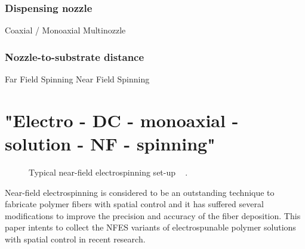 \documentclass[5p,,preprint,12pt,twocolumn]{elsarticle}
\makeatletter
\def\fixFloatSize#1{}%
\makeatother
\begin{document}
\subsubsection{Dispensing nozzle}Coaxial / Monoaxial \mbox{}\protect\newline Multinozzle



\subsubsection{Nozzle-to-substrate distance}Far Field Spinning \mbox{}\protect\newline Near Field Spinning
    
\section{"Electro - DC - monoaxial - solution - NF - spinning"}

\bgroup
\fixFloatSize{images/596d6818-a246-493e-bea0-03f815ab8ff8-unfes.jpg}
\begin{figure}[!htbp]
\centering \makeatletter{}
\makeatother 
\caption{{Typical near-field electrospinning set-up \unskip~\protect\cite{527120:11973130} .}}
\label{f-fe28447572e9}
\end{figure}
\egroup
Near-field electrospinning is considered to be an outstanding technique to fabricate polymer fibers with spatial control and it has suffered several modifications to improve the precision and accuracy of the fiber deposition. This paper intents to collect the NFES variants of electrospunable polymer solutions with spatial control in recent research.
    
\end{document}
